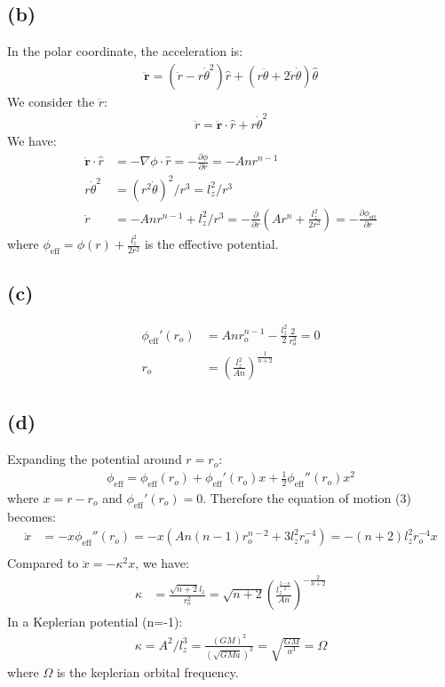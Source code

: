 \documentclass[a4paper,12pt]{article}
\begin{document}
\subsection*{(b)}
In the polar coordinate, the acceleration is:
\begin{align*}
    \boldsymbol{\ddot{r}} = (\ddot{r} - r \dot{\theta}^2) \hat{r} + (r\ddot{\theta} + 2\dot{r}\dot{\theta}) \hat{\theta}
\end{align*}
We consider the $\ddot{r}$:
\begin{align*}
    \ddot{r} = \boldsymbol{\ddot{r}}\cdot \hat{r} + r \dot{\theta}^2
\end{align*}
We have:
\begin{align*}
    \boldsymbol{\ddot{r}}\cdot \hat{r} &= -\nabla \phi \cdot \hat{r} = - \frac{\partial \phi}{\partial r} = - A n r^{n-1} \\
    r \dot{\theta}^2 &= (r^2 \dot \theta)^2/r^3 = l_z^2 / r^3 \\
    \ddot{r} &= - A n r^{n-1} + l_z^2 / r^3 = -\frac{\partial}{\partial r}(Ar^n + \frac{l_z^2}{2r^2}) =  -\frac{\partial \phi_{\text{eff}}}{\partial r}
\end{align*}
where $\phi_{\text{eff}} = \phi(r) + \frac{l_z^2}{2r^2}$ is the effective potential.

\subsection*{(c)}
\begin{align*}
    \phi_{\text{eff}}'(r_o) &= An r_o^{n-1} - \frac{l_z^2}{2} \frac{2}{r_o^3} = 0 \\
    r_o &= (\frac{l_z^2}{An})^{\frac{1}{n+2}}
\end{align*}

\subsection*{(d)}
Expanding the potential around $r = r_o$:
\begin{align*}
    \phi_{\text{eff}} = \phi_{\text{eff}}(r_o) + \phi_{\text{eff}}'(r_o) x + \frac{1}{2} \phi_{\text{eff}}''(r_o) x^2
\end{align*}
where $x = r - r_o$ and $\phi_{\text{eff}}'(r_o)=0$.
Therefore the equation of motion (3) becomes:
\begin{align*}
    \ddot{x} &= - x \phi_{\text{eff}}''(r_o) = -x(An(n-1)r_o^{n-2} + 3 l_z^2 r_o^{-4}) = -(n+2)l_z^2 r_o^{-4} x \\
\end{align*}
Compared to $\ddot{x} = -\kappa^2 x$, we have:
\begin{align*}
    \kappa &= \frac{\sqrt{n+2} l_z}{r_o^2} = \sqrt{n+2} (\frac{l_z^{\frac{2-n}{2}}}{An})^{-\frac{2}{n+2}}
\end{align*}
In a Keplerian potential (n=-1):
\begin{align*}
    \kappa = A^2 / l_z^3 = \frac{(GM)^2}{(\sqrt{GM a})^3} = \sqrt{\frac{GM}{a^3}} = \Omega
\end{align*}
where $\Omega$ is the keplerian orbital frequency.
\end{document}
